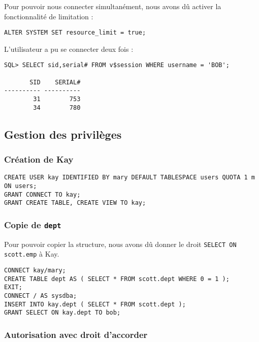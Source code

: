Pour pouvoir nous connecter simultanément, nous avons dû activer la
fonctionnalité de limitation :
\begin{verbatim}
ALTER SYSTEM SET resource_limit = true;
\end{verbatim}

L’utilisateur a pu se connecter deux fois :
\begin{verbatim}
SQL> SELECT sid,serial# FROM v$session WHERE username = 'BOB';

       SID    SERIAL#                                                           
---------- ----------                                                           
        31        753                                                           
        34        780                                                           
\end{verbatim}

\subsection{Gestion des privilèges}

\subsubsection{Création de Kay}

\begin{verbatim}
CREATE USER kay IDENTIFIED BY mary DEFAULT TABLESPACE users QUOTA 1 m ON users;
GRANT CONNECT TO kay;
GRANT CREATE TABLE, CREATE VIEW TO kay;
\end{verbatim}

\subsubsection{Copie de \texttt{dept}}

Pour pouvoir copier la structure, nous avons dû donner le droit \verb|SELECT ON scott.emp| à Kay.

\begin{verbatim}
CONNECT kay/mary;
CREATE TABLE dept AS ( SELECT * FROM scott.dept WHERE 0 = 1 );
EXIT;
CONNECT / AS sysdba;
INSERT INTO kay.dept ( SELECT * FROM scott.dept );
GRANT SELECT ON kay.dept TO bob;
\end{verbatim}

\subsubsection{Autorisation avec droit d’accorder}

